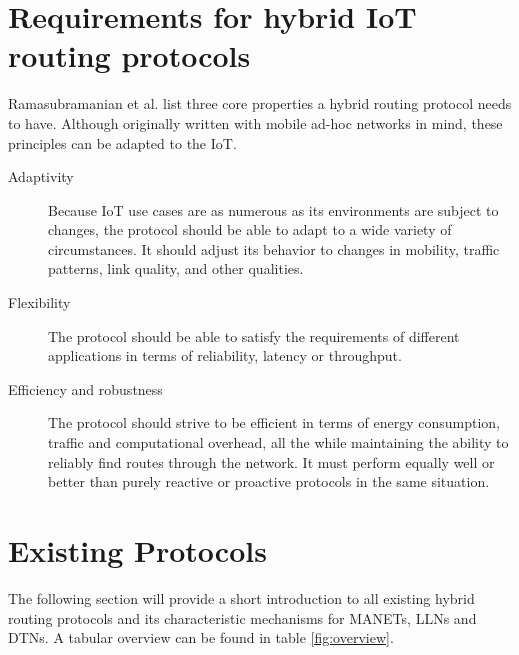 \documentclass[a4paper,10pt]{scrartcl}
\begin{document}
\section{Requirements for hybrid IoT routing protocols}
\label{subsec:requirements}
Ramasubramanian et al. \cite{SHARP} list three core properties a hybrid routing protocol needs to have. Although originally written with mobile ad-hoc networks in mind, these principles can be adapted to the IoT.
\begin{description}
\item[Adaptivity] Because IoT use cases are as numerous as its environments are subject to changes, the protocol should be able to adapt to a wide variety of circumstances. It should adjust its behavior to changes in mobility, traffic patterns, link quality, and other qualities.
\item[Flexibility] The protocol should be able to satisfy the requirements of different applications in terms of reliability, latency or throughput.
\item[Efficiency and robustness] The protocol should strive to be efficient in terms of energy consumption, traffic and computational overhead, all the while maintaining the ability to reliably find routes through the network. It must perform equally well or better than purely reactive or proactive protocols in the same situation.
\end{description}

\section{Existing Protocols}
\label{sec:existing_protocols}
The following section will provide a short introduction to all existing hybrid routing protocols and its characteristic mechanisms for \glspl{MANET}, \glspl{LLN} and \glspl{DTN}. A tabular overview can be found in table \ref{fig:overview}.
\end{document}
